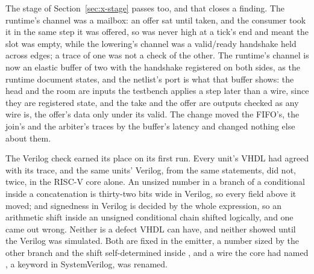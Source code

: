 The stage of Section~\ref{sec:x-stage} passes too, and that closes a
finding. The runtime's channel was a mailbox: an offer sat until
taken, and the consumer took it in the same step it was offered, so
 was never high at a tick's end and  meant
the slot was empty, while the lowering's channel was a valid/ready
handshake held across edges; a trace of one was not a check of the
other. The runtime's channel is now an elastic buffer of two with the
handshake registered on both sides, as the runtime document states,
and the netlist's port is what that buffer shows: the head and the
room are inputs the testbench applies a step later than a wire, since
they are registered state, and the take and the offer are outputs
checked as any wire is, the offer's data only under its valid. The
change moved the FIFO's, the join's and the arbiter's traces by the
buffer's latency and changed nothing else about them.

The Verilog check earned its place on its first run. Every unit's
VHDL had agreed with its trace, and the same units' Verilog, from the
same statements, did not, twice, in the RISC-V core alone. An unsized
number in a branch of a conditional inside a concatenation is thirty-two
bits wide in Verilog, so every field above it moved; and signedness in
Verilog is decided by the whole expression, so an arithmetic shift
inside an unsigned conditional chain shifted logically, and one
 came out wrong. Neither is a defect VHDL can have, and
neither showed until the Verilog was simulated. Both are fixed in the
emitter, a number sized by the other branch and the shift
self-determined inside , and a wire the core had
named , a keyword in SystemVerilog, was renamed.
